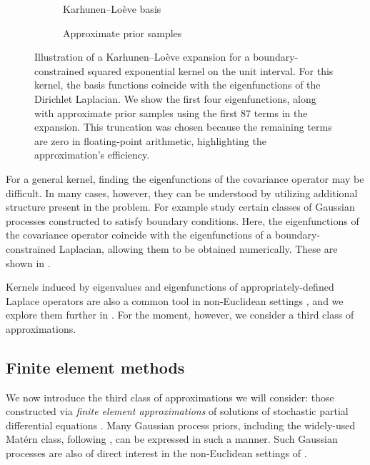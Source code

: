 \documentclass[11pt]{book}
\begin{document}
\begin{figure}
\begin{subfigure}{0.49\textwidth}

\caption{Karhunen--Loève basis}
\end{subfigure}
\begin{subfigure}{0.49\textwidth}

\caption{Approximate prior samples}
\end{subfigure}
\caption[Karhunen--Loève prior approximations]{Illustration of a Karhunen--Loève expansion for a boundary-constrained squared exponential kernel on the unit interval.
For this kernel, the basis functions coincide with the eigenfunctions of the Dirichlet Laplacian.
We show the first four eigenfunctions, along with approximate prior samples using the first 87 terms in the expansion. This truncation was chosen because the remaining terms are zero in floating-point arithmetic, highlighting the approximation's efficiency.}
\label{fig:gp-kl}
\end{figure}

For a general kernel, finding the eigenfunctions of the covariance operator may be difficult.
In many cases, however, they can be understood by utilizing additional structure present in the problem.
For example \textcite{solin19} study certain classes of Gaussian processes constructed to satisfy boundary conditions.
Here, the eigenfunctions of the covariance operator coincide with the eigenfunctions of a boundary-constrained Laplacian, allowing them to be obtained numerically.
These are shown in .

Kernels induced by eigenvalues and eigenfunctions of appropriately-defined Laplace operators are also a common tool in non-Euclidean settings \cite{solin18,solin20,coveney20}, and we explore them further in .
For the moment, however, we consider a third class of approximations.

\subsection{Finite element methods}

We now introduce the third class of approximations we will consider: those constructed via \emph{finite element approximations} of solutions of stochastic partial differential equations \cite{lord14,lototsky17,krainski18}.
Many Gaussian process priors, including the widely-used Matérn class, following \textcite{whittle54,whittle63,lindgren11}, can be expressed in such a manner.
Such Gaussian processes are also of direct interest in the non-Euclidean settings of .
\end{document}
